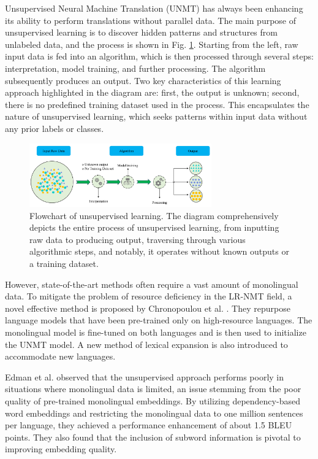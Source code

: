 \documentclass[acmsmall]{acmart}
\begin{document}
Unsupervised Neural Machine Translation (UNMT) has always been enhancing its ability to perform translations without parallel data. 
The main purpose of unsupervised learning is to discover hidden patterns and structures from unlabeled data, and the process is shown in Fig. \ref{fig:five}. Starting from the left, raw input data is fed into an algorithm, which is then processed through several steps: interpretation, model training, and further processing. The algorithm subsequently produces an output. Two key characteristics of this learning approach highlighted in the diagram are: first, the output is unknown; second, there is no predefined training dataset used in the process. This encapsulates the nature of unsupervised learning, which seeks patterns within input data without any prior labels or classes.
\begin{figure}
\centering
\includegraphics[width=0.7\textwidth]{UnsupervisedLearning.pdf} 
\caption{Flowchart of unsupervised learning. The diagram comprehensively depicts the entire process of unsupervised learning, from inputting raw data to producing output, traversing through various algorithmic steps, and notably, it operates without known outputs or a training dataset.} 
\label{fig:five} 
\end{figure}

However, state-of-the-art methods often require a vast amount of monolingual data. To mitigate the problem of resource deficiency in the LR-NMT field, a novel effective method is proposed by Chronopoulou et al. \cite{n4-69}. They repurpose language models that have been pre-trained only on high-resource languages. The monolingual model is fine-tuned on both languages and is then used to initialize the UNMT model. A new method of lexical expansion is also introduced to accommodate new languages.

Edman et al. \cite{n4-70} observed that the unsupervised approach performs poorly in situations where monolingual data is limited, an issue stemming from the poor quality of pre-trained monolingual embeddings. By utilizing dependency-based word embeddings and restricting the monolingual data to one million sentences per language, they achieved a performance enhancement of about 1.5 BLEU points. They also found that the inclusion of subword information is pivotal to improving embedding quality.
\end{document}
